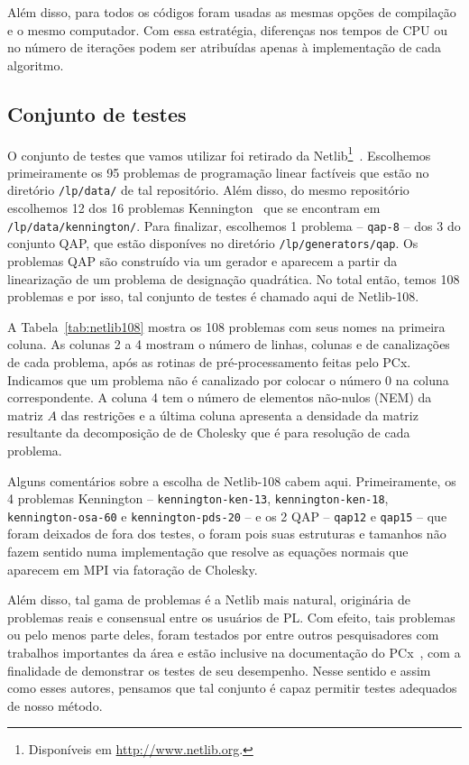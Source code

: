 Além disso, para todos os códigos foram usadas as mesmas opções de compilação e o mesmo computador. Com essa estratégia, diferenças nos tempos de CPU ou no número de iterações podem ser atribuídas apenas à implementação de cada algoritmo.


\subsection{Conjunto de testes}

O conjunto de testes que vamos utilizar foi retirado da Netlib\footnote{Disponíveis em \url{http://www.netlib.org}.}~\cite{Dongarra:1987jk}. Escolhemos primeiramente os \num{95} problemas de programação linear factíveis que estão no diretório \verb|/lp/data/| de tal repositório.  Além disso, do mesmo repositório escolhemos \num{12} dos \num{16} problemas Kennington~\cite{Kennington:1990vo} que se encontram em \verb|/lp/data/kennington/|. Para finalizar, escolhemos 1 problema -- \texttt{qap-8} -- dos \num{3} do conjunto  QAP, que estão disponíves no diretório \verb|/lp/generators/qap|. Os problemas QAP são  construído via um gerador  e  aparecem a partir da linearização de um problema  de designação quadrática. No total então, temos 108 problemas e por isso, tal conjunto de testes é chamado aqui de Netlib-108. 


A Tabela~\ref{tab:netlib108} mostra os \num{108} problemas com seus nomes na primeira coluna. As colunas 2 a 4 mostram o número de linhas, colunas e de canalizações de cada problema, após as rotinas de pré-processamento feitas pelo PCx. Indicamos que um problema  não é canalizado por colocar o número \num{0} na coluna correspondente. A coluna 4 tem o número de elementos não-nulos (NEM) da matriz $A$ das restrições e a última coluna apresenta a densidade da matriz resultante da decomposição de de Cholesky que é para resolução de cada problema.


Alguns comentários sobre a escolha de Netlib-108 cabem aqui. Primeiramente, os \num{4} problemas  Kennington -- \texttt{kennington-ken-13}, \texttt{kennington-ken-18}, \texttt{ken\-ning\-ton-osa-60} e \texttt{ken\-ning\-ton-pds-20} --  e os \num{2} QAP -- \texttt{qap12} e \texttt{qap15} --  que foram deixados de fora dos testes, o foram pois suas estruturas e tamanhos não fazem sentido numa implementação que resolve as equações normais que aparecem em \ac{MPI} via fatoração de Cholesky. 

Além disso, tal gama de problemas é a Netlib mais natural, originária de problemas reais e consensual entre os usuários de \ac{PL}. Com efeito, tais problemas ou pelo menos parte deles, foram testados por \textcite{Mehrotra:1992wr,Colombo:2008ia,Mehrotra:2005do,Jarre:1999tl,Gondzio:1996uw} entre outros pesquisadores com trabalhos importantes da área e estão inclusive na documentação do PCx~\cite{Czyzyk:1998vw,Czyzyk:1999hk}, com a finalidade de demonstrar os testes de seu desempenho. Nesse sentido e assim como esses autores, pensamos que tal conjunto é capaz permitir testes adequados de nosso método. 


